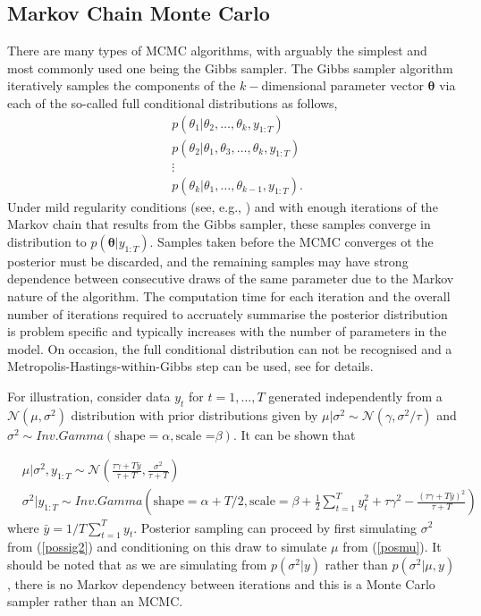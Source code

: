 \documentclass[12pt,a4paper]{article}%
\numberwithin{equation}{section}
\begin{document}
\subsection{Markov Chain Monte Carlo} \label{sec:MCMC}

There are many types of MCMC algorithms, with arguably the simplest and most commonly used one being the Gibbs sampler. The Gibbs sampler algorithm iteratively samples the components of the $k-$dimensional parameter vector $\boldsymbol{\theta}$ via each of the so-called full conditional distributions as follows,
\begin{align}
&p(\theta_1 | \theta_2, \dots, \theta_k, y_{1:T}) \nonumber \\
&p(\theta_2 | \theta_1, \theta_3, \dots, \theta_k, y_{1:T}) \nonumber \\
&\vdots \nonumber \\
&p(\theta_k | \theta_1, \dots, \theta_{k-1}, y_{1:T}). \nonumber
\end{align}
Under mild regularity conditions (see, e.g., \citet{Tierney1994}) and with enough iterations of the Markov chain that results from the Gibbs sampler, these samples converge in distribution to $p(\boldsymbol{\theta} | y_{1:T})$. Samples taken before the MCMC converges ot the posterior must be discarded, and the remaining samples may have strong dependence between consecutive draws of the same parameter due to the Markov nature of the algorithm. The computation time for each iteration and the overall number of iterations required to accruately summarise the posterior distribution is problem specific and typically increases with the number of parameters in the model. On occasion, the full conditional distribution can not be recognised and a Metropolis-Hastings-within-Gibbs step can be used, see \citet{Gilks1995} for details.

For illustration, consider data $y_t$ for $t = 1, \dots, T$ generated independently from a $\mathcal{N}(\mu, \sigma^2)$ distribution with prior distributions given by $\mu | \sigma^2 \sim \mathcal{N}(\gamma, \sigma^2/\tau)$ and $\sigma^2 \sim Inv.Gamma(\mbox{shape} = \alpha, \mbox{scale =}\beta)$. It can be shown that

\begin{align}
&\mu | \sigma^2, y_{1:T} \sim \mathcal{N} \left(\frac{\tau\gamma + T\bar{y}}{\tau + T}, \frac{\sigma^2}{\tau  + T} \right) \label{posmu} \\
&\sigma^2 | y_{1:T} \sim Inv.Gamma  \left( \mbox{shape} = \alpha + T/2, \mbox{scale} = \beta + \frac{1}{2}\sum_{t=1}^{T}y_t^2 + \tau\gamma^2 - \frac{(\tau\gamma + T\bar{y})^2}{\tau + T} \right) \label{possig2} 
\end{align}
where $\bar{y} = 1/T \sum_{t=1}^{T}y_t$. Posterior sampling can proceed by first simulating $\sigma^2$ from (\ref{possig2}) and conditioning on this draw to simulate $\mu$ from (\ref{posmu}). It should be noted that as we are simulating from $p(\sigma^2 | y)$ rather than $p(\sigma^2 | \mu, y)$, there is no Markov dependency between iterations and this is a Monte Carlo sampler rather than an MCMC.
\end{document}

